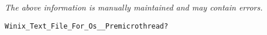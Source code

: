 \label{pkg:winix\_text\_file\_for\_posix\_\_premicrothread}

{\tiny \it The above information is manually maintained and may contain errors.}
\begin{verbatim}
Winix_Text_File_For_Os__Premicrothread?
\end{verbatim}
